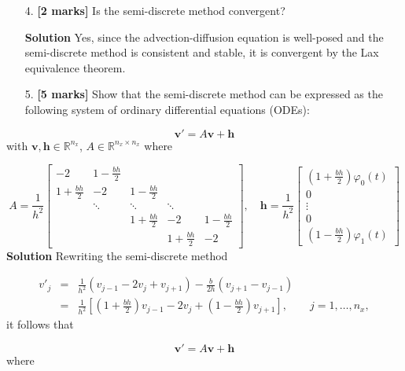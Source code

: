 \documentclass[12pt,a4paper]{article}
\begin{document}
\begin{itemize}
\item[4. ] \textbf{[2 marks]} Is the semi-discrete method convergent?

\textbf{Solution} Yes, since the advection-diffusion equation is well-posed and the semi-discrete method is consistent and stable, it is convergent by the Lax equivalence theorem.


\item[5. ] \textbf{[5 marks]} Show that the semi-discrete method can be expressed as the following system of ordinary differential equations (ODEs):

\end{itemize}
\[
\mathbf{v}' = A\mathbf{v} + \mathbf{h}
\]
with $\mathbf{v}, \mathbf{h} \in \mathbb{R}^{n_x}$, $A \in \mathbb{R}^{n_x \times n_x}$ where

\[
A = \frac{1}{h^2}\begin{bmatrix}
-2 & 1 - \frac{bh}{2} & & & \\
1 + \frac{bh}{2}  & -2 & 1 - \frac{bh}{2}  & & \\
      & \ddots & \ddots & \ddots & \\
      &        & 1 + \frac{bh}{2}    & -2 & 1 - \frac{bh}{2} \\
      &        &        &1 + \frac{bh}{2}      & -2
\end{bmatrix}, \quad
\mathbf{h} = \frac{1}{h^2}\left[\begin{array}{c} 
{} \left(1 + \frac{bh}{2}\right)\varphi_0(t)\\
0 \\
\vdots \\
0 \\
\left(1 - \frac{bh}{2}\right)\varphi_1(t)
\end{array}
\right]
\]
\textbf{Solution} Rewriting the semi-discrete method


\begin{eqnarray*}
v'_j &=& \frac{1}{h^2}\left(v_{j-1} - 2v_j + v_{j+1}   \right) - \frac{b}{2h}\left(v_{j+1}  - v_{j-1}   \right) \\
&=& \frac{1}{h^2}\left[ \left(1 + \frac{bh}{2}\right)v_{j-1} - 2v_j +  \left(1 - \frac{bh}{2}\right)v_{j+1}  \right],\qquad j = 1, \ldots, n_x,
\end{eqnarray*}
it follows that


\begin{equation*}
\mathbf{v}' = A\mathbf{v} + \mathbf{h}
\end{equation*}
where
\end{document}
